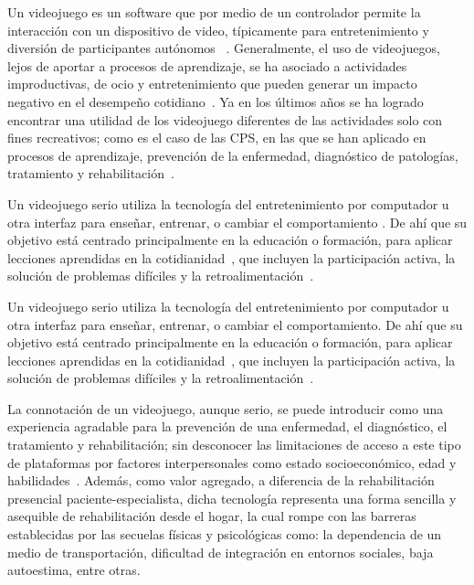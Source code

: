 \begin{introduction}
    \vspace{5pt}
    Un videojuego es un software que por medio de un controlador permite la interacción con un dispositivo de video, típicamente para entretenimiento y diversión de participantes autónomos ~\cite{studenski2010interactive,gomez2012videojuegos, gonzalez2016mooc}. Generalmente, el uso de videojuegos, lejos de aportar a procesos de aprendizaje, se ha asociado a actividades improductivas, de ocio y entretenimiento que pueden generar un impacto negativo en el desempeño cotidiano~\cite{maldonado2014videojuegos}. Ya en los últimos años se ha logrado encontrar una utilidad de los videojuego diferentes de las actividades solo con fines recreativos; como es el caso de las CPS, en las que se han aplicado en procesos de aprendizaje, prevención de la enfermedad, diagnóstico de patologías, tratamiento y rehabilitación~\cite{ladino2021uso}. 

    \vspace{5pt}
    Un videojuego serio utiliza la tecnología del entretenimiento por computador u otra interfaz para enseñar, entrenar, o cambiar el comportamiento . De ahí que su objetivo está centrado principalmente en la educación o formación, para aplicar lecciones aprendidas en la cotidianidad~\cite{graafland2014serious}, que incluyen la participación activa, la solución de problemas difíciles y la retroalimentación~\cite{gee2004learning}.
    
    \vspace{5pt} Un videojuego serio utiliza la tecnología del entretenimiento por computador u otra interfaz para enseñar, entrenar, o cambiar el comportamiento. De ahí que su objetivo está centrado principalmente en la educación o formación, para aplicar lecciones aprendidas en la cotidianidad~\cite{graafland2014serious}, que incluyen la participación activa, la solución de problemas difíciles y la retroalimentación~\cite{gee2004learning}. 
    
    \vspace{5pt} La connotación de un videojuego, aunque serio, se puede introducir como una experiencia agradable para la prevención de una enfermedad, el diagnóstico, el tratamiento y rehabilitación; sin desconocer las limitaciones de acceso a este tipo de plataformas por factores interpersonales como estado socioeconómico, edad y habilidades~\cite{ladino2021uso}. Además, como valor agregado, a diferencia de la rehabilitación presencial paciente-especialista, dicha tecnología representa una forma sencilla y asequible de rehabilitación desde el hogar, la cual rompe con las barreras establecidas por las secuelas físicas y psicológicas como: la dependencia de un medio de transportación, dificultad de integración en entornos sociales, baja autoestima, entre otras. 
    

\end{introduction}
